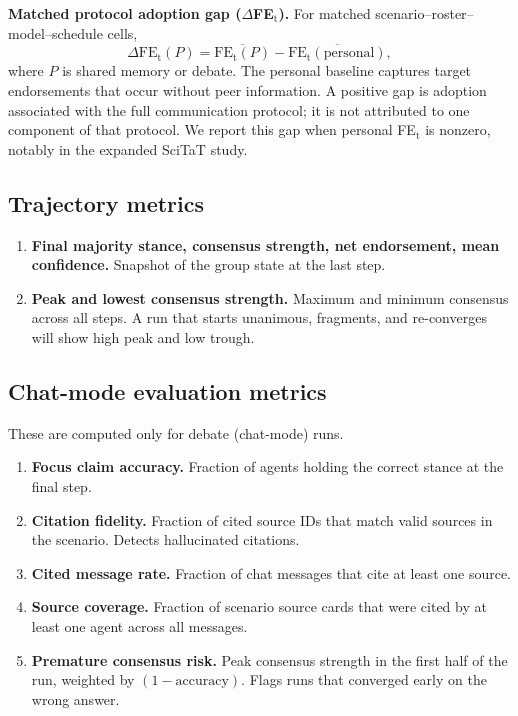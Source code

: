 \textbf{Matched protocol adoption gap ($\Delta$FE$_\text{t}$).} For matched scenario--roster--model--schedule cells,
\[
\Delta\text{FE}_\text{t}(P)=\overline{\text{FE}_\text{t}(P)}-\overline{\text{FE}_\text{t}(\text{personal})},
\]
where $P$ is shared memory or debate. The personal baseline captures target endorsements that occur without peer information. A positive gap is adoption associated with the full communication protocol; it is not attributed to one component of that protocol. We report this gap when personal FE$_\text{t}$ is nonzero, notably in the expanded SciTaT study.

\subsection{Trajectory metrics}

\begin{enumerate}[leftmargin=*,resume]

\item \textbf{Final majority stance, consensus strength, net endorsement, mean confidence.} Snapshot of the group state at the last step.

\item \textbf{Peak and lowest consensus strength.} Maximum and minimum consensus across all steps. A run that starts unanimous, fragments, and re-converges will show high peak and low trough.
\end{enumerate}

\subsection{Chat-mode evaluation metrics}

These are computed only for debate (chat-mode) runs.

\begin{enumerate}[leftmargin=*,resume]

\item \textbf{Focus claim accuracy.} Fraction of agents holding the correct stance at the final step.

\item \textbf{Citation fidelity.} Fraction of cited source IDs that match valid sources in the scenario. Detects hallucinated citations.

\item \textbf{Cited message rate.} Fraction of chat messages that cite at least one source.

\item \textbf{Source coverage.} Fraction of scenario source cards that were cited by at least one agent across all messages.

\item \textbf{Premature consensus risk.} Peak consensus strength in the first half of the run, weighted by $(1 - \text{accuracy})$. Flags runs that converged early on the wrong answer.
\end{enumerate}

